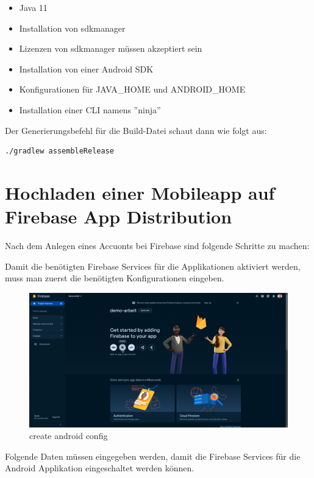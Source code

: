 \begin{itemize}
  \item Java 11
  \item Installation von sdkmanager
  \item Lizenzen von sdkmanager müssen akzeptiert sein
  \item Installation von einer Android SDK
  \item Konfigurationen für JAVA\_HOME und ANDROID\_HOME
  \item Installation einer CLI namens ''ninja''
\end{itemize}

Der Generierungsbefehl für die Build-Datei schaut dann wie folgt aus:

\begin{lstlisting}[language=bash,caption=generate apk]
 ./gradlew assembleRelease
 \end{lstlisting}





\section{Hochladen einer Mobileapp auf Firebase App Distribution}

Nach dem Anlegen eines Accuonts bei Firebase sind folgende Schritte zu machen:

Damit die benötigten Firebase Services für die Applikationen aktiviert werden, muss man zuerst die benötigten Konfigurationen eingeben.
\begin{figure}[H]
  \includegraphics[width=\textwidth]{./pics/firebase1.png}
  \caption{create android config}
\end{figure}


Folgende Daten müssen eingegeben werden, damit die Firebase Services für die Android Applikation eingeschaltet werden können.

